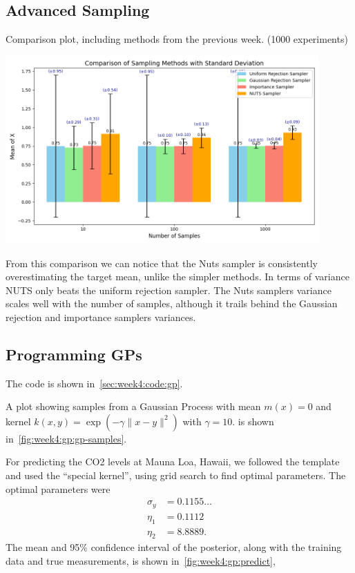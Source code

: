 \subsection{Advanced Sampling}
Comparison plot, including methods from the previous week. (1000 experiments)
\begin{center}
    \includegraphics[width=12cm]{./figures/comparison2.png}
\end{center}
From this comparison we can notice that the Nuts sampler is consistently overestimating the target mean, unlike the simpler methods.
In terms of variance NUTS only beats the uniform rejection sampler.
The Nuts samplers variance scales well with the number of samples, 
although it trails behind the Gaussian rejection and importance samplers variances.





\subsection{Programming GPs}

The code is shown in~\cref{sec:week4:code:gp}.

A plot showing samples from a Gaussian Process
with mean $m(x) = 0$ and kernel
$k(x, y) = \exp{\left( -\gamma \parallel x - y \parallel^2 \right)}$
with $\gamma = 10$.
is shown in~\cref{fig:week4:gp:gp-samples}.

For predicting the CO2 levels at Mauna Loa, Hawaii,
we followed the template and used the ``special kernel'',
using grid search to find optimal parameters.
The optimal parameters were
\begin{align*}
  \sigma_y &= 0.1155\ldots \\
  \eta_1 &= 0.1112 \\
  \eta_2 &= 8.8889.
\end{align*}
The mean and 95\% confidence interval of the posterior,
along with the training data and true measurements,
is shown in~\cref{fig:week4:gp:predict},

